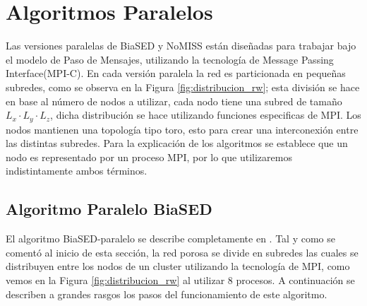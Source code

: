 \section{Algoritmos Paralelos}
\label{subsec:algspar}

Las versiones paralelas de BiaSED y NoMISS están diseñadas para trabajar bajo el modelo de Paso de Mensajes, utilizando la tecnología de 
Message Passing Interface(MPI-C). En cada versión paralela la red es particionada en pequeñas subredes, como se observa en la 
Figura \ref{fig:distribucion_rw}; esta división se hace en base al número de nodos a utilizar, cada nodo tiene una subred 
de tamaño $L_x \cdot L_y \cdot L_z$, dicha distribución se hace utilizando funciones especificas de MPI. Los nodos mantienen 
una topología tipo toro, esto para crear una interconexión entre las distintas subredes. Para la explicación de los algoritmos se
 establece que un nodo es representado por un proceso MPI, por lo que utilizaremos indistintamente ambos términos.

\subsection{Algoritmo Paralelo BiaSED}
\label{subsubsec:pbiased}
El algoritmo BiaSED-paralelo se describe completamente en \cite{ref4}. Tal y como se coment\'o al inicio de esta secci\'on, la red 
porosa se divide en subredes las cuales se distribuyen entre los nodos de un cluster utilizando la tecnología de MPI, 
como vemos en la Figura \ref{fig:distribucion_rw} al utilizar 8 procesos. A continuación se describen a grandes rasgos los pasos del
funcionamiento de este algoritmo.


